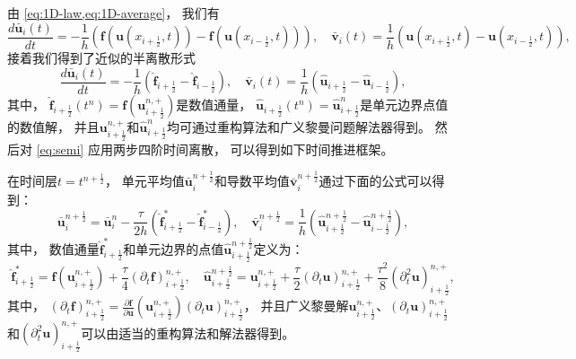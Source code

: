 由 \cref{eq:1D-law,eq:1D-average}，
我们有
\begin{equation}
  \frac{d \bar{\bm{u}}_i(t)}{dt} = -\frac{1}{h} \left({\bm{f}}({\bm{u}}(x_{i+\frac 12},t)) - {\bm{f}}({\bm{u}}(x_{i-\frac 12},t))\right), \quad
  \bar{\bm{v}}_{i}(t) = \frac{1}{h} \left({\bm{u}}(x_{i+\frac 12},t) - {\bm{u}}(x_{i-\frac 12},t)\right),
\end{equation}
接着我们得到了近似的半离散形式
\begin{equation}
  \label{eq:semi}
  \frac{d \bar{\bm{u}}_i(t)}{dt} = -\frac{1}{h} \left(\hat{\bm{f}}_{i+\frac 12} - \hat{\bm{f}}_{i-\frac 12}\right), \quad
  \bar{\bm{v}}_{i}(t) = \frac{1}{h} \left(\hat {\bm{u}}_{i+\frac 12} - \hat {\bm{u}}_{i-\frac 12}\right),
\end{equation}
其中，
$\hat{\bm{f}}_{i+\frac 12}(t^n) = {\bm{f}}({\bm{u}}_{i+\frac{1}{2}}^{n,+})$是数值通量，
$\hat {\bm{u}}_{i+\frac 12}(t^{n})=\hat {\bm{u}}_{i+\frac 12}^{n}$是单元边界点值的数值解，
并且${\bm{u}}_{i+\frac{1}{2}}^{n,+}$和$\hat {\bm{u}}_{i+\frac 12}^{n}$均可通过重构算法和广义黎曼问题解法器得到。
然后对 \cref{eq:semi} 应用两步四阶时间离散，
可以得到如下时间推进框架。

\vspace{0.3\baselineskip} %
在时间层$t=t^{n+\frac{1}{2}}$，
单元平均值$\bar{\bm{u}}_{i}^{n+\frac{1}{2}}$和导数平均值$\bar{\bm{v}}_{i}^{n+\frac{1}{2}}$通过下面的公式可以得到：
\begin{equation}
  \bar{\bm{u}}_{i}^{n+\frac 12}=\bar{\bm{u}}_{i}^{n}-\frac{\tau}{2 h} \left(\hat{\bm{f}}_{i+\frac 12}^*-\hat{\bm{f}}_{i-\frac 12}^*\right), \quad
  \bar{\bm{v}}_{i}^{n+\frac 12}=\frac{1}{h} \left(\hat {\bm{u}}_{i+\frac 12}^{n+\frac 12}-\hat {\bm{u}}_{i-\frac 12}^{n+\frac 12}\right),
\end{equation}
其中，
数值通量$\hat{\bm{f}}_{i+\frac 12}^*$和单元边界的点值$\hat {\bm{u}}_{i+\frac 12}^{n+\frac 12}$定义为：
\begin{equation}
  \label{eq:1D-uhat-1}
  \hat{\bm{f}}^*_{i+\frac{1}{2}}={\bm{f}} \left({\bm{u}}_{i+\frac{1}{2}}^{n, +}\right) +\frac{\tau}{4} \left({\partial_{t}}{\bm{f}}\right)_{i+\frac{1}{2}}^{n, +}, \quad
  \hat {\bm{u}}_{i+\frac{1}{2}}^{n+\frac 12}={\bm{u}}_{i+\frac{1}{2}}^{n, +}+\frac{\tau}{2} \left({\partial_{t}}{\bm{u}}\right)_{i+\frac{1}{2}}^{n, +}+\frac{\tau^2}{8} \left({\partial_{t}^2}{\bm{u}}\right)_{i+\frac{1}{2}}^{n, +},
\end{equation}
其中，
$\left({\partial_{t}}{\bm{f}}\right)_{i+\frac{1}{2}}^{n, +} = \frac{\partial{\bm{f}}}{\partial{\bm{u}}}\left({\bm{u}}_{i+\frac{1}{2}}^{n, +}\right) \left({\partial_{t}}{\bm{u}}\right)_{i+\frac{1}{2}}^{n, +}$，
并且广义黎曼解${\bm{u}}_{i+\frac{1}{2}}^{n, +}$、$\left({\partial_{t}}{\bm{u}}\right)_{i+\frac{1}{2}}^{n, +}$和$\left({\partial_{t}^2}{\bm{u}}\right)_{i+\frac{1}{2}}^{n, +}$可以由适当的重构算法和解法器得到。

